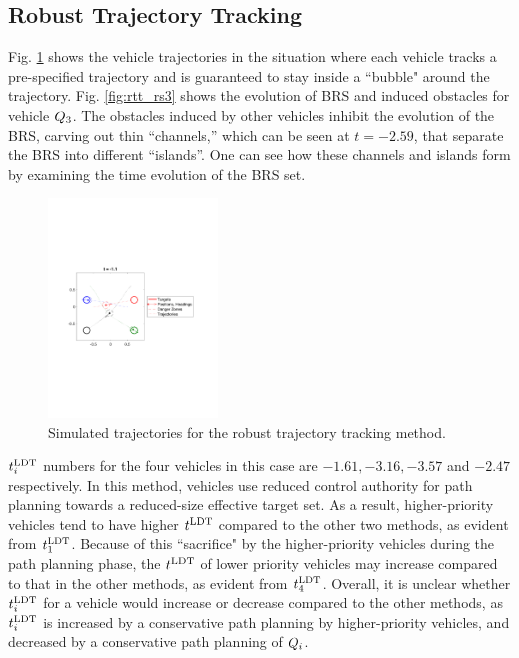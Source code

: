 \subsection{Robust Trajectory Tracking}
Fig. \ref{fig:rtt_traj} shows the vehicle trajectories in the situation where each vehicle tracks a pre-specified trajectory and is guaranteed to stay inside a ``bubble" around the trajectory. Fig. \ref{fig:rtt_rs3} shows the evolution of BRS and induced obstacles for vehicle $Q_3$. The obstacles induced by other vehicles inhibit the evolution of the BRS, carving out thin “channels,” which can be seen at $t = -2.59$, that separate the BRS into different “islands”. One can see how these channels and islands form by examining the time evolution of the BRS set.

\begin{figure}
  \centering
  \includegraphics[width=0.40\textwidth]{"fig/rtt_traj"}
  \caption{Simulated trajectories for the robust trajectory tracking method.}
  \label{fig:rtt_traj}
  \vspace{-2em}
\end{figure}

$t^\text{LDT}_i$ numbers for the four vehicles in this case are $-1.61, -3.16, -3.57$ and $-2.47$ respectively. In this method, vehicles use reduced control authority for path planning towards a reduced-size effective target set. As a result, higher-priority vehicles tend to have higher $t^\text{LDT}$ compared to the other two methods, as evident from $t^\text{LDT}_1$. Because of this ``sacrifice" by the higher-priority vehicles during the path planning phase, the $t^\text{LDT}$ of lower priority vehicles may increase compared to that in the other methods, as evident from $t^\text{LDT}_4$. Overall, it is unclear whether $t^\text{LDT}_i$ for a vehicle would increase or decrease compared to the other methods, as $t^\text{LDT}_i$ is increased by a conservative path planning by higher-priority vehicles, and decreased by a conservative path planning of $Q_i$. 

